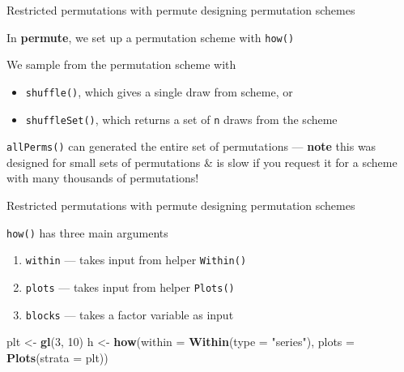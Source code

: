 \documentclass[10pt,ignorenonframetext,compress, aspectratio=169]{beamer}
\newenvironment{Shaded}{\begin{snugshade}}{\end{snugshade}}
\newcommand{\KeywordTok}[1]{\textcolor[rgb]{0.13,0.29,0.53}{\textbf{{#1}}}}
\newcommand{\DataTypeTok}[1]{\textcolor[rgb]{0.13,0.29,0.53}{{#1}}}
\newcommand{\DecValTok}[1]{\textcolor[rgb]{0.00,0.00,0.81}{{#1}}}
\newcommand{\StringTok}[1]{\textcolor[rgb]{0.31,0.60,0.02}{{#1}}}
\newcommand{\NormalTok}[1]{{#1}}
\providecommand{\tightlist}{%
  \setlength{\itemsep}{0pt}\setlength{\parskip}{0pt}}
\begin{document}
\begin{frame}[fragile]{Restricted permutations with permute \textbar{}
designing permutation schemes}

In \textbf{permute}, we set up a permutation scheme with \texttt{how()}

We sample from the permutation scheme with

\begin{itemize}
\tightlist
\item
  \texttt{shuffle()}, which gives a single draw from scheme, or
\item
  \texttt{shuffleSet()}, which returns a set of \texttt{n} draws from
  the scheme
\end{itemize}

\texttt{allPerms()} can generated the entire set of permutations ---
\textbf{note} this was designed for small sets of permutations \& is
slow if you request it for a scheme with many thousands of permutations!

\end{frame}

\begin{frame}[fragile]{Restricted permutations with permute \textbar{}
designing permutation schemes}

\texttt{how()} has three main arguments

\begin{enumerate}
\def\labelenumi{\arabic{enumi}.}
\tightlist
\item
  \texttt{within} --- takes input from helper \texttt{Within()}
\item
  \texttt{plots} --- takes input from helper \texttt{Plots()}
\item
  \texttt{blocks} --- takes a factor variable as input
\end{enumerate}

\scriptsize

\begin{Shaded}
\begin{Highlighting}[]
\NormalTok{plt <-}\StringTok{ }\KeywordTok{gl}\NormalTok{(}\DecValTok{3}\NormalTok{, }\DecValTok{10}\NormalTok{)}
\NormalTok{h <-}\StringTok{ }\KeywordTok{how}\NormalTok{(}\DataTypeTok{within =} \KeywordTok{Within}\NormalTok{(}\DataTypeTok{type =} \StringTok{"series"}\NormalTok{), }\DataTypeTok{plots =} \KeywordTok{Plots}\NormalTok{(}\DataTypeTok{strata =} \NormalTok{plt))}
\end{Highlighting}
\end{Shaded}

\normalsize

\end{frame}
\end{document}
